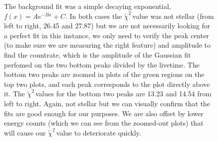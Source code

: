 \documentclass{article}
\newcommand{\redchi}{$\tilde{\chi}^2\,$}
\begin{document}
\begin{figure}[!htb]
\begin{tabular}{c c}
    \end{tabular}
    \caption{The background fit was a simple decaying exponential, $f(x) = Ae^{-Bx} + C$.  In both cases the \redchi value was not stellar (from left to right, 26.45 and 27.87) but we are not necessarily looking for a perfect fit in this instance, we only need to verify the peak center (to make sure we are measuring the right feature) and amplitude to find the countrate, which is the amplitude of the Gaussian fit perfomed on the two bottom peaks divided by the livetime.  The bottom two peaks are zoomed in plots of the green regions on the top two plots, and each peak corresponds to the plot directly above it.  The \redchi values for the bottom two peaks are 13.23 and 14.54 from left to right.  Again, not stellar but we can visually confirm that the fits are good enough for our purposes.  We are also offset by lower energy counts (which we can see from the zoomed-out plots) that will cause our \redchi value to deteriorate quickly.}
    \label{nolead}
  \end{figure}
\end{document}

